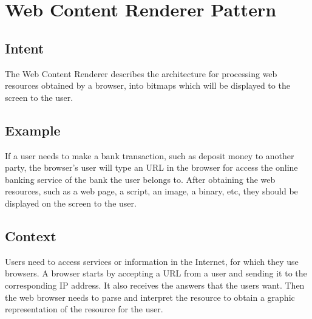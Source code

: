 \documentclass{sig-alternate-05-2015}
\begin{document}
\section{Web Content Renderer Pattern}

  \subsection*{Intent}

  The Web Content Renderer describes the architecture for processing web resources obtained by a browser, into bitmaps which will be displayed to the screen to the user.

  \subsection*{Example}
  If a user needs to make a bank transaction, such as deposit money to another party, the browser's user will type an URL in the browser for access the online banking service of the bank the user belongs to. After obtaining the web resources, such as a web page, a script, an image, a binary, etc, they should be displayed on the screen to the user.
  
  \subsection*{Context}
  Users need to access services or information in the Internet, for which they use browsers. A browser starts by accepting a URL from a user and sending it to the corresponding IP address. It also receives the answers that the users want. Then the web browser needs to parse and interpret the resource to obtain a graphic representation of the resource for the user.
\end{document}
